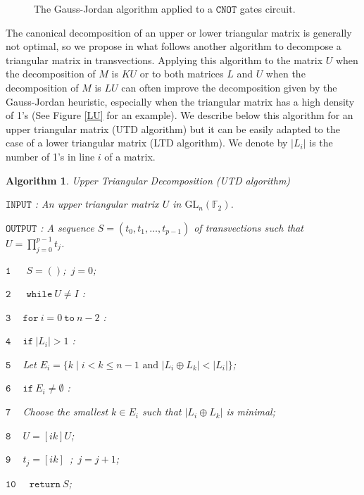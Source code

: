 \documentclass[a4paper,12pt,fleqn]{article}
\newcommand\cnot{\mathtt{CNOT}}
\newcommand\GL[1][n]{\mathrm{GL}_{#1}(\mathbb{F}_2)}
\renewcommand\leq{\leqslant}
\newtheorem{algo}[theo]{Algorithm}
\begin{document}
\begin{figure}[h]
{
}
 \caption{ The Gauss-Jordan algorithm applied to a $\cnot$ gates circuit.\label{Gauss}}
    \end{figure}



    The canonical decomposition of an upper or lower triangular matrix is generally not optimal, so we propose in what follows another algorithm to decompose a triangular matrix in transvections. Applying this algorithm to the matrix $U$ when the decomposition of $M$ is $KU$ or to both matrices $L$ and $U$ when the decomposition of $M$ is $LU$ can often improve the decomposition given by the Gauss-Jordan heuristic, especially when the triangular matrix has a high density of 1's (See Figure \ref{LU} for an example). We describe below this algorithm for an upper triangular matrix (UTD algorithm) but it can be easily adapted to the case of a lower triangular matrix (LTD algorithm). 
    We denote by $|L_i|$ is the number of 1's in line $i$ of a matrix.

    \begin{algo} Upper Triangular Decomposition (UTD algorithm)
      
      $\mathtt{INPUT}$ : An upper triangular matrix $U$ in $\GL$.
      
      $\mathtt{OUTPUT}$ : A sequence  $S=(t_0,t_1,\dots,t_{p-1})$ of transvections such that  $U=\prod_{j=0}^{p-1}t_j$. 

      $\mathtt{1}\quad\ $ $S=()$;\  $j=0$;

      $\mathtt{2}\quad\ $ $\mathtt{while}\ U\neq I$ : 

      $\mathtt{3}\quad\ $\quad $\mathtt{for}\  i=0\  \mathtt{to}\ n-2$ :
      
      $\mathtt{4}\quad\ $\quad\quad $\mathtt{if}\ |L_i|>1$ :

      $\mathtt{5}\quad\ $\quad\quad\quad Let $E_i=\{ k \mid i<k\leq n-1 \text{ and } |L_i\oplus L_k|<|L_i|\}$;
      
      $\mathtt{6}\quad\ $\quad\quad\quad $\mathtt{if}\ E_i\neq \emptyset$ :

      $\mathtt{7}\quad\ $\quad\quad\quad\quad Choose the smallest $k\in E_i$ such that $|L_i\oplus L_k|$ is minimal;

      $\mathtt{8}\quad\ $\quad\quad\quad\quad $U=[ik]U$;

      $\mathtt{9}\quad\ $\quad\quad\quad\quad $t_j=[ik]$\ ;\  $j=j+1$;

      $\mathtt{10}\quad$ $\mathtt{return}\  S$;

    \end{algo}
\end{document}
